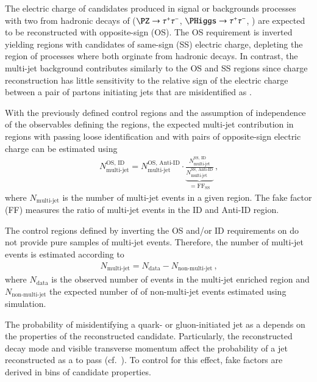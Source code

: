 The electric charge of \tauhadvis candidates produced in signal or
backgrounds processes with two \tauhadvis from hadronic decays of
\tauleptons ($\PZ \to \tautau$, $\PHiggs \to \tautau$, \ttbar) are
expected to be reconstructed with opposite-sign (OS). The OS
requirement is inverted yielding regions with \tauhadvis candidates of
same-sign (SS) electric charge, depleting the region of processes
where both \tauhadvis orginate from hadronic \taulepton decays. In
contrast, the multi-jet background contributes similarly to the OS and
SS regions since \tauhadvis charge reconstruction has little
sensitivity to the relative sign of the electric charge between a pair
of partons initiating jets that are misidentified as \tauhadvis.

With the previously defined control regions and the assumption of
independence of the observables defining the regions, the expected
multi-jet contribution in regions with \tauhadvis passing loose
identification and with \tauhadvis pairs of opposite-sign electric
charge can be estimated using
\begin{align*}
  N_\text{multi-jet}^{\text{OS, ID}} =
  N_\text{multi-jet}^{\text{OS, Anti-ID}}
  \cdot
  \underbrace{\frac{N_\text{multi-jet}^{\text{SS, ID}}}
  {N_\text{multi-jet}^{\text{SS, Anti-ID}}}}
  _{= \text{FF}_{\text{SS}}} \,\text{,}
\end{align*}
where $N_\text{multi-jet}$ is the number of multi-jet events in a
given region. The fake factor (FF) measures the ratio of multi-jet
events in the ID and Anti-ID region.%

The control regions defined by inverting the OS and/or ID requirements
on \tauhadvis do not provide pure samples of multi-jet
events. Therefore, the number of multi-jet events is estimated
according to
\begin{align*}
  N_\text{multi-jet} = N_\text{data} - N_\text{non-multi-jet} \,\text{,}
\end{align*}
where $N_\text{data}$ is the observed number of events in the
multi-jet enriched region and $N_\text{non-multi-jet}$ the expected
number of of non-multi-jet events estimated using simulation.

The probability of misidentifying a quark- or gluon-initiated jet as a
\tauhadvis depends on the properties of the reconstructed \tauhadvis
candidate. Particularly, the reconstructed decay mode and visible
transverse momentum affect the probability of a jet reconstructed as a
\tauhadvis to pass \tauid (cf.\ ). To control for this
effect, fake factors are derived in bins of \tauhadvis candidate
properties.

